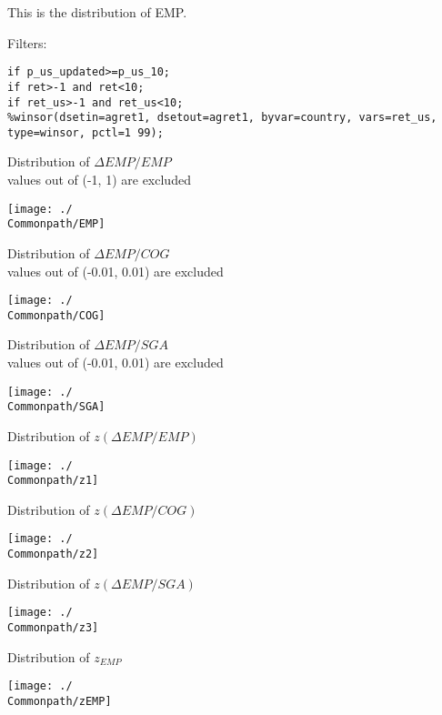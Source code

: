 





\thispagestyle{fancy}

\newcommand{\code}{\texttt}
\newcommand*{\Commonpath}{20181227/distribution}

This is the distribution of EMP.

Filters:

\code{if p\_us\_updated>=p\_us\_10;} \\
\code{if ret>-1 and ret<10;} \\
\code{if ret\_us>-1 and ret\_us<10;} \\
\code{\%winsor(dsetin=agret1, dsetout=agret1, byvar=country, vars=ret\_us, type=winsor, pctl=1 99);}


Distribution of $\Delta EMP/EMP$ \\
values out of (-1, 1) are excluded

\texttt{[image: ./\\Commonpath/EMP]}


\newpage
Distribution of $\Delta EMP/COG$ \\
values out of (-0.01, 0.01) are excluded

\texttt{[image: ./\\Commonpath/COG]}

\newpage
Distribution of $\Delta EMP/SGA$ \\
values out of (-0.01, 0.01) are excluded

\texttt{[image: ./\\Commonpath/SGA]}

\newpage
Distribution of $z(\Delta EMP/EMP)$

\texttt{[image: ./\\Commonpath/z1]}

\newpage
Distribution of $z(\Delta EMP/COG)$

\texttt{[image: ./\\Commonpath/z2]}

\newpage
Distribution of $z(\Delta EMP/SGA)$

\texttt{[image: ./\\Commonpath/z3]}

\newpage
Distribution of $z_{EMP}$

\texttt{[image: ./\\Commonpath/zEMP]}



